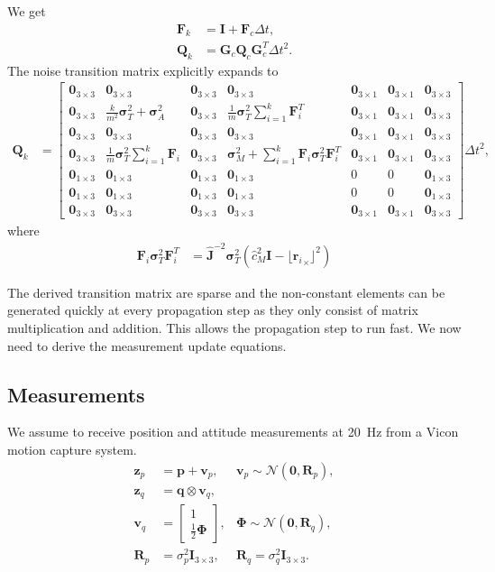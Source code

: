 \documentclass[10pt,a4paper]{article}
\newcommand{\skewsym}[1]{\lfloor #1 _\times \rfloor}
\newcommand{\kmomh}{\hat{c}_M}
\newcommand{\Inertia}{\mathbf{J}}
\newcommand{\zthree}{\mathbf{0}_{3\times3}}
\newcommand{\zthreeone}{\mathbf{0}_{3\times1}}
\newcommand{\zonethree}{\mathbf{0}_{1\times3}}
\newcommand{\identity}{\mathbf{I}_{3\times3}}
\newcommand{\sigmat}{\boldsymbol{\sigma}_T}
\newcommand{\sigmaa}{\boldsymbol{\sigma}_A}
\newcommand{\sigmam}{\boldsymbol{\sigma}_M}
\begin{document}
We get
\begin{align}
\mathbf{F}_k &= \mathbf{I} + \mathbf{F}_c \Delta t, \label{eq:system_discrete}\\
\mathbf{Q}_k &= \mathbf{G}_c \mathbf{Q}_c \mathbf{G}_c^T \Delta t ^2 \label{eq:system_noise_discrete}.
\end{align}
The noise transition matrix explicitly expands to
\begin{align}
\mathbf{Q}_k &= \begin{bmatrix}
\zthree & \zthree & \zthree & \zthree & \zthreeone & \zthreeone & \zthree \\
\zthree & \frac{k}{m^2} \sigmat^2 + \sigmaa^2 & \zthree & \frac{1}{m} \sigmat^2 \sum_{i=1}^k \mathbf{F}_i^T & \zthreeone & \zthreeone & \zthree \\
\zthree & \zthree & \zthree & \zthree & \zthreeone & \zthreeone & \zthree \\
\zthree & \frac{1}{m} \sigmat^2 \sum_{i=1}^k \mathbf{F}_i & \zthree & \sigmam^2 + \sum_{i=1}^k \mathbf{F}_i \sigmat^2 \mathbf{F}_i^T & \zthreeone & \zthreeone & \zthree \\
\zonethree & \zonethree & \zonethree & \zonethree & 0 & 0 & \zonethree \\
\zonethree & \zonethree & \zonethree & \zonethree & 0 & 0 & \zonethree \\
\zthree & \zthree & \zthree & \zthree & \zthreeone & \zthreeone & \zthree 
\end{bmatrix} \Delta t^2  \label{eq:system_noise_discrete_explicit} ,
\end{align}
where
\begin{align}
\mathbf{F}_i \sigmat^2 \mathbf{F}_i^T &= \hat{\Inertia}^{-2} \sigmat^2 \left( \kmomh^2 \mathbf{I} - \skewsym{{\mathbf{r}_i}}^2 \right) 
\end{align}

The derived transition matrix are sparse and the non-constant elements can be generated quickly at every propagation step as they only consist of matrix multiplication and addition. This allows the propagation step to run fast. We now need to derive the measurement update equations.

\subsection*{Measurements}
We assume to receive position and attitude measurements at \SI{20}{\hertz} from a Vicon motion capture system. 
\begin{align}
\mathbf{z}_p &= \mathbf{p} + \mathbf{v}_p, & \boldsymbol{v}_p \sim \mathbf{\mathcal{N}} \left( \mathbf{0}, \mathbf{R}_p \right),\\
\mathbf{z}_q &= \mathbf{q} \otimes \mathbf{v}_q, \\
\mathbf{v}_q &= \begin{bmatrix}
1 \\ \frac{1}{2} \boldsymbol{\Phi} 
\end{bmatrix} , & \boldsymbol{\Phi} \sim \mathbf{\mathcal{N}} \left( \mathbf{0}, \mathbf{R}_q \right), \\
\mathbf{R}_p & = \sigma_p^2 \identity, & \mathbf{R}_q = \sigma_q^2 \identity.
\end{align}
\end{document}
